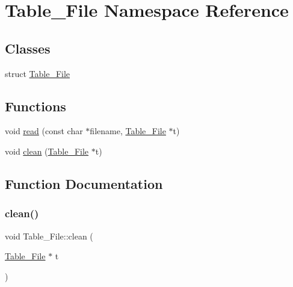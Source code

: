 \hypertarget{namespace_table___file}{}\section{Table\+\_\+\+File Namespace Reference}
\label{namespace_table___file}
\subsection*{Classes}
\begin{DoxyCompactItemize}
\item 
struct \mbox{\hyperlink{struct_table___file_1_1_table___file}{Table\+\_\+\+File}}
\end{DoxyCompactItemize}
\subsection*{Functions}
\begin{DoxyCompactItemize}
\item 
void \mbox{\hyperlink{namespace_table___file_aa8bf3033f2d73225dca1ca2b453020e6}{read}} (const char $\ast$filename, \mbox{\hyperlink{struct_table___file_1_1_table___file}{Table\+\_\+\+File}} $\ast$t)
\item 
void \mbox{\hyperlink{namespace_table___file_af80ff848c463b7f4215770a5b2e1a1be}{clean}} (\mbox{\hyperlink{struct_table___file_1_1_table___file}{Table\+\_\+\+File}} $\ast$t)
\end{DoxyCompactItemize}


\subsection{Function Documentation}
\mbox{\label{namespace_table___file_af80ff848c463b7f4215770a5b2e1a1be}} 
\subsubsection{\texorpdfstring{clean()}{clean()}}
{\footnotesize\ttfamily void Table\+\_\+\+File\+::clean (\begin{DoxyParamCaption}\item[{\mbox{\hyperlink{struct_table___file_1_1_table___file}{Table\+\_\+\+File}} $\ast$}]{t }\end{DoxyParamCaption})}

